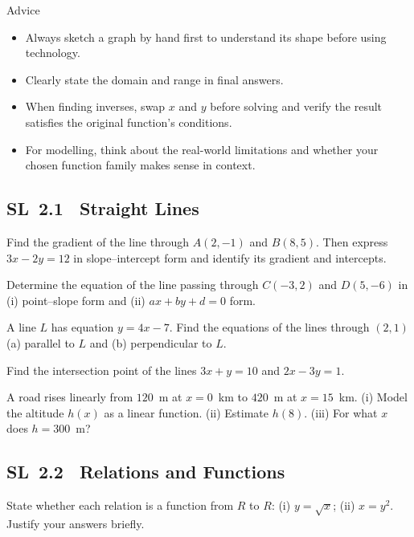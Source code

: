 \documentclass[11pt]{article}
\def\textbf#1{#1}%
\def\mathbb#1{#1}%
\newcommand{\tocsubsection}[1]{\subsection{#1}}
\newcounter{question}
\begin{document}
\textbf{Advice}  
\begin{itemize}
  \item Always sketch a graph by hand first to understand its shape before using technology.
  \item Clearly state the domain and range in final answers.
  \item When finding inverses, swap $x$ and $y$ before solving and verify the result satisfies the original function’s conditions.
  \item For modelling, think about the real-world limitations and whether your chosen function family makes sense in context.
\end{itemize}

\tocsubsection{SL 2.1 \; Straight Lines}

\begin{question}
Find the gradient of the line through $A(2,-1)$ and $B(8,5)$.  Then express
$3x-2y=12$ in slope–intercept form and identify its gradient and intercepts.
\end{question}

\begin{question}
Determine the equation of the line passing through $C(-3,2)$ and $D(5,-6)$ in
(i) point–slope form and (ii) $ax+by+d=0$ form.
\end{question}

\begin{question}
A line $L$ has equation $y=4x-7$.  Find the equations of the lines through
$(2,1)$ (a) parallel to $L$ and (b) perpendicular to $L$.
\end{question}

\begin{question}
Find the intersection point of the lines $3x+y=10$ and $2x-3y=1$.
\end{question}

\begin{question}
A road rises linearly from $120$ m at $x=0$ km to $420$ m at $x=15$ km.
(i) Model the altitude $h(x)$ as a linear function.  (ii) Estimate $h(8)$.
(iii) For what $x$ does $h=300$ m?
\end{question}

\tocsubsection{SL 2.2 \; Relations and Functions}

\begin{question}
State whether each relation is a function from $\mathbb{R}$ to $\mathbb{R}$:
(i) $y=\sqrt{x}$; (ii) $x=y^2$.  Justify your answers briefly.
\end{question}
\end{document}
